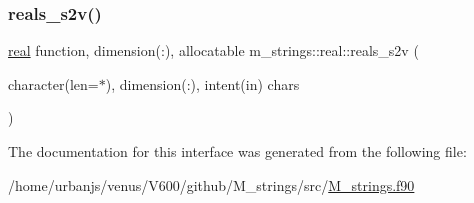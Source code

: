 \subsubsection{\texorpdfstring{reals\+\_\+s2v()}{reals\_s2v()}}
{\footnotesize\ttfamily \mbox{\hyperlink{interfacem__strings_1_1real}{real}} function, dimension(\+:), allocatable m\+\_\+strings\+::real\+::reals\+\_\+s2v (\begin{DoxyParamCaption}\item[{character(len=$\ast$), dimension(\+:), intent(in)}]{chars }\end{DoxyParamCaption})\hspace{0.3cm}{\ttfamily [private]}}



The documentation for this interface was generated from the following file\+:\begin{DoxyCompactItemize}
\item 
/home/urbanjs/venus/\+V600/github/\+M\+\_\+strings/src/\mbox{\hyperlink{M__strings_8f90}{M\+\_\+strings.\+f90}}\end{DoxyCompactItemize}
